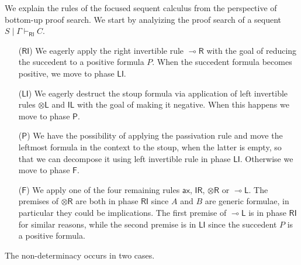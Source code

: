 \documentclass[submission,copyright,creativecommons]{eptcs}
\theoremstyle{definition}
\newcommand{\tl}{\otimes \mathsf{L}}
\newcommand{\tr}{\otimes \mathsf{R}}
\newcommand{\lright}{{\multimap}\mathsf{R}}
\newcommand{\lleft}{{\multimap}\mathsf{L}}
\newcommand{\pass}{\mathsf{pass}}
\newcommand{\unitl}{\mathsf{IL}}
\newcommand{\unitr}{\mathsf{IR}}
\newcommand{\ax}{\mathsf{ax}}
\newcommand{\RI}{\mathsf{RI}}
\newcommand{\LI}{\mathsf{LI}}
\newcommand{\Pass}{\mathsf{P}}
\newcommand{\F}{\mathsf{F}}
\begin{document}
We explain the rules of the focused sequent calculus from the perspective of bottom-up proof search. We start by analyizing the proof search of a sequent $S \mid \Gamma \vdash_{\RI} C$.
\begin{itemize}
\item[($\RI$)] We eagerly apply the right invertible rule $\lright$ with the goal of reducing the succedent to a positive formula $P$.
  When the succedent formula becomes positive, we move to phase $\LI$.
\item[($\LI$)] We eagerly destruct the stoup formula via application of left invertible rules $\tl$ and $\unitl$ with the goal of making it negative. When this happens we move to phase $\Pass$.
\item[($\Pass$)] We have the possibility of applying the passivation rule and move the leftmost formula in the context to the stoup, when the latter is empty, so that we can decompose it using left invertible rule in phase $\LI$. Otherwise we move to phase $\F$.
\item[($\F$)] We apply one of the four remaining rules $\ax$, $\unitr$, $\tr$ or $\lleft$. The premises of $\tr$ are both in phase $\RI$ since $A$ and $B$ are generic formulae, in particular they could be implications. The first premise of $\lleft$ is in phase $\RI$ for similar reasons, while the second premise is in $\LI$ since the succedent $P$ is a positive formula.
\end{itemize}
The non-determinacy occurs in two cases.
\end{document}
